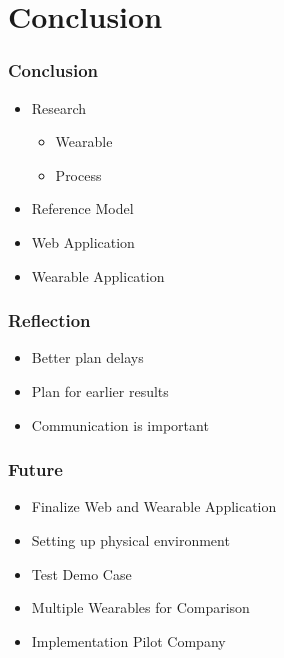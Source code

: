 \section{Conclusion}
\begin{frame}\frametitle{Conclusion}
	\begin{itemize}
		\item Research
		\begin{itemize}
			\item Wearable
			\item Process
		\end{itemize}
		\item Reference Model
		\item Web Application
		\item Wearable Application
	\end{itemize}
\end{frame}
\begin{frame}\frametitle{Reflection}
	\begin{itemize}
		\item Better plan delays
		\item Plan for earlier results
		\item Communication is important
	\end{itemize}
\end{frame}
\begin{frame}\frametitle{Future}
	\begin{itemize}
		\item Finalize Web and Wearable Application
		\item Setting up physical environment
		\item Test Demo Case
	\end{itemize}
	\begin{itemize}
		\item Multiple Wearables for Comparison
		\item Implementation Pilot Company
	\end{itemize}
\end{frame}